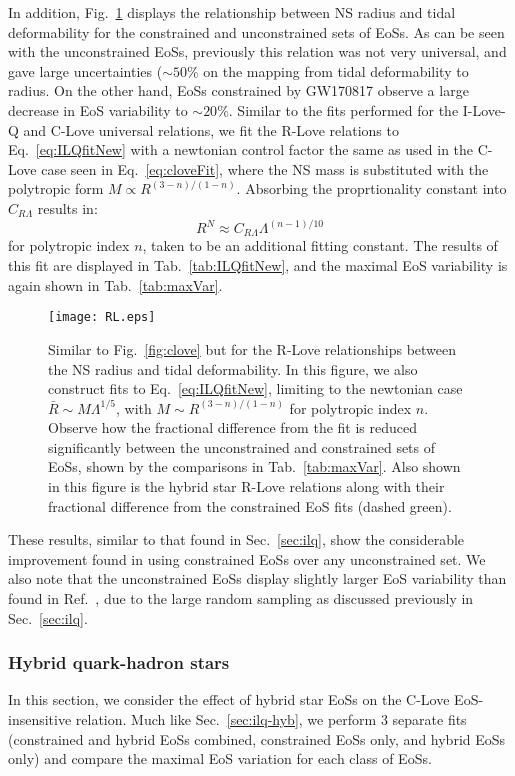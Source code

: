 \documentclass[prd,twocolumn,nofootinbib,superscriptaddress,amsmath,amssymb]{revtex4-1}
\begin{document}
In addition, Fig.~\ref{fig:rlove} displays the relationship between NS radius and tidal deformability for the constrained and unconstrained sets of EoSs.
As can be seen with the unconstrained EoSs, previously this relation was not very universal, and gave large uncertainties ($\sim50\%$ on the mapping from tidal deformability to radius.
On the other hand, EoSs constrained by GW170817 observe a large decrease in EoS variability to $\sim20\%$.
Similar to the fits performed for the I-Love-Q and C-Love universal relations, we fit the R-Love relations to Eq.~\ref{eq:ILQfitNew} with a newtonian control factor the same as used in the C-Love case seen in Eq.~\ref{eq:cloveFit}, where the NS mass is substituted with the polytropic form $M\propto R^{(3-n)/(1-n)}$.
Absorbing the proprtionality constant into $C_{R\Lambda}$ results in:
\begin{equation}
R^N \approx C_{R\Lambda}\Lambda^{(n-1)/10}
\end{equation}
for polytropic index $n$, taken to be an additional fitting constant.
The results of this fit are displayed in Tab.~\ref{tab:ILQfitNew}, and the maximal EoS variability is again shown in Tab.~\ref{tab:maxVar}.
\begin{figure}
\begin{center} 
\texttt{[image: RL.eps]}
\end{center}
\caption{
Similar to Fig.~\ref{fig:clove} but for the R-Love relationships between the NS radius and tidal deformability.
In this figure, we also construct fits to  Eq.~\ref{eq:ILQfitNew}, limiting to the newtonian case $\bar{R} \sim M\Lambda^{1/5}$, with $M\sim R^{(3-n)/(1-n)}$ for polytropic index $n$.
Observe how the fractional difference from the fit is reduced significantly between the unconstrained and constrained sets of EoSs, shown by the comparisons in Tab.~\ref{tab:maxVar}.
Also shown in this figure is the hybrid star R-Love relations along with their fractional difference from the constrained EoS fits (dashed green).
}
\label{fig:rlove}
\end{figure} 

These results, similar to that found in Sec.~\ref{sec:ilq}, show the considerable improvement found in using constrained EoSs over any unconstrained set.
We also note that the unconstrained EoSs display slightly larger EoS variability than found in Ref.~\cite{Yagi:binLove}, due to the large random sampling as discussed previously in Sec.~\ref{sec:ilq}.


\subsubsection{Hybrid quark-hadron stars}\label{sec:clove-hyb}
In this section, we consider the effect of hybrid star EoSs on the C-Love EoS-insensitive relation.
Much like Sec.~\ref{sec:ilq-hyb}, we perform 3 separate fits (constrained and hybrid EoSs combined, constrained EoSs only, and hybrid EoSs only) and compare the maximal EoS variation for each class of EoSs.
\end{document}
